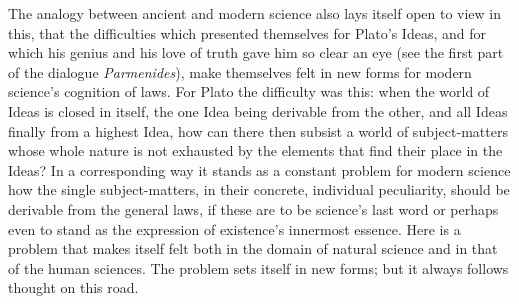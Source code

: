 \documentclass[12pt]{book}
\newcommand{\opage}[1]{\marginnote{\footnotesize\textit{[#1]}}}
\begin{document}
The analogy between ancient and modern science also lays itself open to view in
this, that the difficulties which presented themselves for Plato's Ideas, and for
which his genius and his love of truth gave him so clear an eye (see the first
part of the dialogue \textit{Parmenides}), make themselves felt in new forms for
modern science's cognition of laws. For Plato the difficulty was this: when the
world of Ideas is closed in itself, the one Idea being derivable from the other,
and all Ideas finally from a highest Idea, how can there then subsist a world of
subject-matters whose whole nature is not exhausted by the elements that find
their place in the Ideas? In a corresponding way it stands as a constant \opage{75}problem
for modern science how the single subject-matters, in their concrete, individual
peculiarity, should be derivable from the general laws, if these are to be
science's last word or perhaps even to stand as the expression of existence's
innermost essence. Here is a problem that makes itself felt both in the domain of
natural science and in that of the human sciences. The problem sets itself in new
forms; but it always follows thought on this road.
\end{document}
